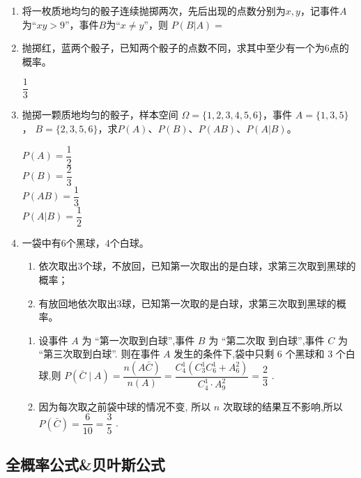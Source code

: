 \begin{enumerate}
\item 将一枚质地均匀的骰子连续抛掷两次，先后出现的点数分别为$x,y$，记事件$A$为“$xy>9$”，事件$B$为“$x\ne y$”，则 $P(B|A)=$

\item 抛掷红，蓝两个骰子，已知两个骰子的点数不同，求其中至少有一个为$6$点的概率。
\begin{jieda}
    $\dfrac{1}{3}$
\end{jieda}


\item 抛掷一颗质地均匀的骰子，样本空间 $\Omega=\{1,2,3,4,5,6\}$，事件 $A=\{1,3,5\}$， $B=\{2,3,5,6\}$，求$P(A)$、$P(B)$、$P(AB)$、$P(A|B)$。
\begin{jieda}
 $P(A)=\dfrac{1}{2}$\\
        $P(B)=\dfrac{2}{3}$\\
        $P(AB)=\dfrac{1}{3}$\\
        $P(A|B)=\dfrac{1}{2}$
\end{jieda}

\item 一袋中有$6$个黑球，$4$个白球。
\begin{enumerate}
\item 依次取出$3$个球，不放回，已知第一次取出的是白球，求第三次取到黑球的概率；
\item 有放回地依次取出$3$球，已知第一次取的是白球，求第三次取到黑球的概率。
\end{enumerate}
\begin{jieda}
    \begin{enumerate}
        \item 设事件 $A$ 为 “第一次取到白球”,事件 $B$ 为 “第二次取
到白球”,事件 $C$ 为 “第三次取到白球”.
则在事件 $A$ 发生的条件下,袋中只剩 6 个黑球和 3 个白球,则 $P\left( {\bar{C} \mid  A}\right)  = \dfrac{n\left( {A\bar{C}}\right) }{n\left( A\right) } = \dfrac{{{C}}_{4}^{1}\left( {{{C}}_{3}^{1}{{C}}_{6}^{1} + {{A}}_{6}^{2}}\right) }{{{C}}_{4}^{1} \cdot  {{A}}_{9}^{2}} = \dfrac{2}{3}$ .
        \item 因为每次取之前袋中球的情况不变,
所以 $n$ 次取球的结果互不影响,所以 $P\left( \bar{C}\right)  = \dfrac{6}{10} = \dfrac{3}{5}$ .
    \end{enumerate}
\end{jieda}

\end{enumerate}

\clearpage
\subsection*{全概率公式\&贝叶斯公式}


